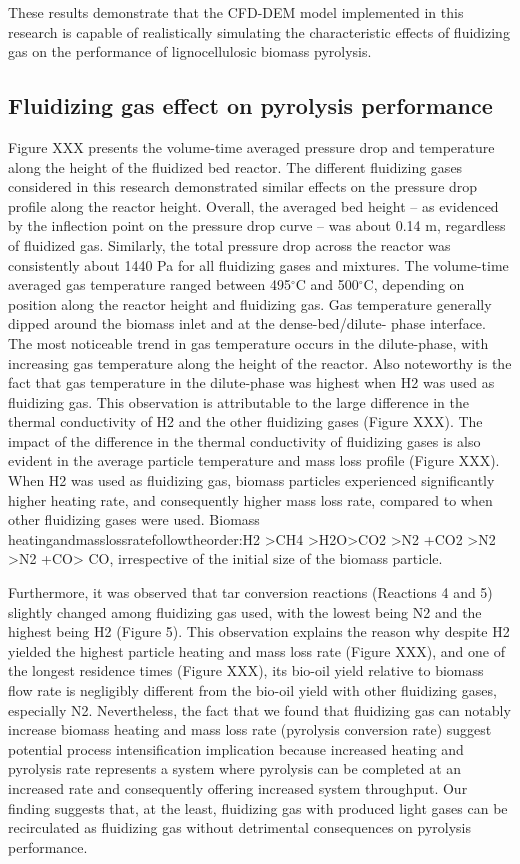 These results demonstrate that the CFD-DEM model implemented in this research is capable of realistically simulating the characteristic effects of fluidizing gas on the performance of lignocellulosic biomass pyrolysis.


\subsection{Fluidizing gas effect on pyrolysis performance}

Figure XXX presents the volume-time averaged pressure drop and temperature along the height of the fluidized bed reactor. The different fluidizing gases considered in this research demonstrated similar effects on the pressure drop profile along the reactor height. Overall, the averaged bed height – as evidenced by the inflection point on the pressure drop curve – was about 0.14 m, regardless of fluidized gas. Similarly, the total pressure drop across the reactor was consistently about 1440 Pa for all fluidizing gases and mixtures. The volume-time averaged gas temperature ranged between 495$^\circ$C and 500$^\circ$C, depending on position along the reactor height and fluidizing gas. Gas temperature generally dipped around the biomass inlet and at the dense-bed/dilute- phase interface. The most noticeable trend in gas temperature occurs in the dilute-phase, with increasing gas temperature along the height of the reactor. Also noteworthy is the fact that gas temperature in the dilute-phase was highest when H2 was used as fluidizing gas. This observation is attributable to the large difference in the thermal conductivity of H2 and the other fluidizing gases (Figure XXX). The impact of the difference in the thermal conductivity of fluidizing gases is also evident in the average particle temperature and mass loss profile (Figure XXX). When H2 was used as fluidizing gas, biomass particles experienced significantly higher heating rate, and consequently higher mass loss rate, compared to when other fluidizing gases were used. Biomass heatingandmasslossratefollowtheorder:H2 >CH4 >H2O>CO2 >N2 +CO2 >N2 >N2 +CO> CO, irrespective of the initial size of the biomass particle.

Furthermore, it was observed that tar conversion reactions (Reactions 4 and 5) slightly changed among fluidizing gas used, with the lowest being N2 and the highest being H2 (Figure 5). This observation explains the reason why despite H2 yielded the highest particle heating and mass loss rate (Figure XXX), and one of the longest residence times (Figure XXX), its bio-oil yield relative to biomass flow rate is negligibly different from the bio-oil yield with other fluidizing gases, especially N2. Nevertheless, the fact that we found that fluidizing gas can notably increase biomass heating and mass loss rate (pyrolysis conversion rate) suggest potential process intensification implication because increased heating and pyrolysis rate represents a system where pyrolysis can be completed at an increased rate and consequently offering increased system throughput. Our finding suggests that, at the least, fluidizing gas with produced light gases can be recirculated as fluidizing gas without detrimental consequences on pyrolysis performance.


